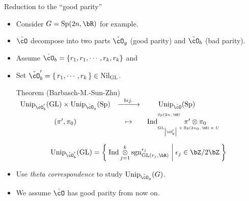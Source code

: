 \documentclass[t,mathserif,11pt]{beamer}
\theoremstyle{plain}
\theoremstyle{definition}
\def\sgn{{\rm sgn}}
\def\abs#1{\left|{#1}\right|}
\def\GL{\mathrm{GL}}
\def\Ind{{\rm Ind}}
\def\Sp{{\mathrm{Sp}}}
\def\Unip{{\mathrm{Unip}}}
\def\ckcO{{\check{\cO}}}
\def\Nil{\mathrm{Nil}}
\def\blue{\color{blue}}
\def\red{\color{red}}
\let\oldemph\emph
\def\emph#1{\oldemph{\blue #1}}
\begin{document}
    \begin{frame}{Reduction to the ``good parity''}
        \begin{itemize}
            \item Consider $G= \Sp(2n,\bR)$ for example. 
            \item  $\ckcO$ decompose into two parts $\ckcO_{g}$ (good parity)  and $\ckcO_{b}$ (bad parity).
            \item Assume $\ckcO_{b} = \{r_1, r_1, \cdots, r_k, r_k\}$ and
            \item Set $\ckcO'_b = \set{r_1,\cdots, r_k}\in \Nil_{\GL}$.\pause \\
            \begin{block}{ Theorem  (Barbasch-M.-Sun-Zhu) }
              \hspace{2em}
              $
            \begin{array}{ccc}
                {\tiny\Unip_{\ckcO'_b}(\GL)
                \times \Unip_{\ckcO_g}(\Sp)} &\xrightarrow{\ \ bij.\ \ }&
                {\tiny \Unip_{\ckcO}(\Sp)} \\[.6em]
                (\pi',\pi_0 ) &\mapsto & 
                \Ind_{\raisebox{-0.5em}{\tiny$\GL_{\abs{\ckcO'_b}}\times \Sp(2n_0,\bR)\ltimes U$}}^{\tiny\raisebox{1em}{$\Sp(2n,\bR)$}}
                \hspace{-5em}\pi'\otimes \pi_0
            \end{array}
            $
          \end{block}
          \vspace{-1em}
            \[
            \begin{split}
                {\tiny\Unip_{\ckcO'_b}(\GL)}
                = 
                \Set{\Ind \mathop{\otimes}_{j=1}^k \sgn^{\epsilon_j}_{\GL(r_j,\bR)}
                |\epsilon_j \in \bZ/2\bZ}
            \end{split}
            \]
            \pause
            \item Use \emph{theta correspondence}  to study 
            $ \Unip_{\ckcO_{g}}(G)$.
            \item We assume  $\ckcO$ has {\red good parity} from now on.
        \end{itemize}
    \end{frame}
\end{document}
